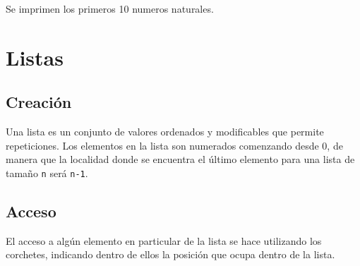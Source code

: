 \begin{code} Se imprimen los primeros 10 numeros naturales.

\begin{Shaded}
\begin{Highlighting}[]
\OperatorTok{=} 
    \OperatorTok{\textless{}=} \NormalTok{:}
\OperatorTok{=}\OperatorTok{+}
\end{Highlighting}
\end{Shaded}
\end{code}

\section{Listas}

\subsection{Creación}

Una lista es un conjunto de valores ordenados y modificables que permite
repeticiones. Los elementos en la lista son numerados comenzando desde
0, de manera que la localidad donde se encuentra el último elemento para
una lista de tamaño \texttt{n} será \texttt{n-1}.

\begin{Shaded}
\begin{Highlighting}[]
\OperatorTok{=}\NormalTok{ [}\NormalTok{, }\NormalTok{, }\NormalTok{, }\NormalTok{, }\NormalTok{]}
\end{Highlighting}
\end{Shaded}

\subsection{Acceso}

El acceso a algún elemento en particular de la lista se hace utilizando
los corchetes, indicando dentro de ellos la posición que ocupa dentro de
la lista.

\begin{Shaded}
\begin{Highlighting}[]
\end{Highlighting}
\end{Shaded}

